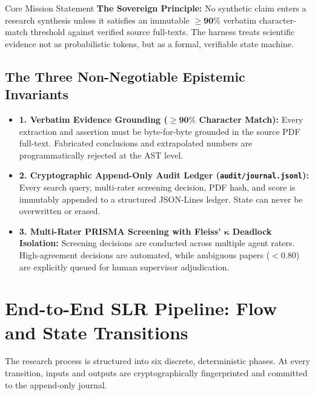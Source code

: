\documentclass[10pt,a4paper]{article}
\begin{document}
\begin{summarybox}{Core Mission Statement}
\textbf{The Sovereign Principle:} No synthetic claim enters a research synthesis unless it satisfies an immutable $\mathbf{\ge 90\%}$ verbatim character-match threshold against verified source full-texts. The harness treats scientific evidence not as probabilistic tokens, but as a formal, verifiable state machine.
\end{summarybox}

\vspace{-2pt}

\subsection{The Three Non-Negotiable Epistemic Invariants}

\begin{itemize}[leftmargin=1.4em, itemsep=1pt, topsep=1pt]
    \item \textbf{1. Verbatim Evidence Grounding ($\ge \mathbf{90\%}$ Character Match):} Every extraction and assertion must be byte-for-byte grounded in the source PDF full-text. Fabricated conclusions and extrapolated numbers are programmatically rejected at the AST level.
    \item \textbf{2. Cryptographic Append-Only Audit Ledger (\texttt{audit/journal.jsonl}):} Every search query, multi-rater screening decision, PDF hash, and score is immutably appended to a structured JSON-Lines ledger. State can never be overwritten or erased.
    \item \textbf{3. Multi-Rater PRISMA Screening with Fleiss' $\boldsymbol{\kappa}$ Deadlock Isolation:} Screening decisions are conducted across multiple agent raters. High-agreement decisions are automated, while ambiguous papers ($<0.80$) are explicitly queued for human supervisor adjudication.
\end{itemize}

\section{End-to-End SLR Pipeline: Flow and State Transitions}

The research process is structured into six discrete, deterministic phases. At every transition, inputs and outputs are cryptographically fingerprinted and committed to the append-only journal.
\end{document}
